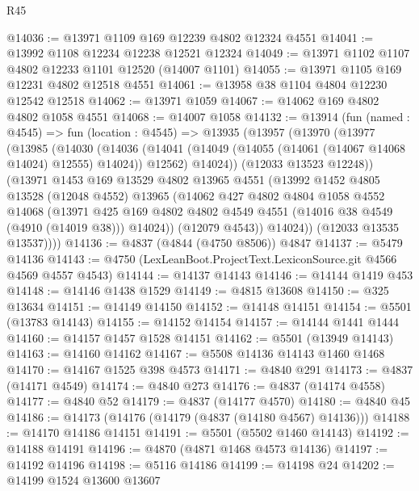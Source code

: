 \begin{lexlean}{R45}
\begin{coremodule}
@14036 := @13971 @1109 @169 @12239 @4802 @12324 @4551
@14041 := @13992 @1108 @12234 @12238 @12521 @12324
@14049 := @13971 @1102 @1107 @4802 @12233 @1101 @12520 (@14007 @1101)
@14055 := @13971 @1105 @169 @12231 @4802 @12518 @4551
@14061 := @13958 @38 @1104 @4804 @12230 @12542 @12518
@14062 := @13971 @1059
@14067 := @14062 @169 @4802 @4802 @1058 @4551
@14068 := @14007 @1058
@14132 := @13914
    (fun (named : @4545) =>
    fun (location : @4545) =>
    @13935
      (@13957
        (@13970
          (@13977
            (@13985
              (@14030
                (@14036
                  (@14041 (@14049 (@14055 (@14061 (@14067 @14068 @14024) @12555) @14024)) @12562)
                  @14024))
              (@12033 @13523 @12248))
            (@13971
              @1453
              @169
              @13529
              @4802
              @13965
              @4551
              (@13992
                @1452
                @4805
                @13528
                (@12048 @4552)
                @13965
                (@14062
                  @427
                  @4802
                  @4804
                  @1058
                  @4552
                  @14068
                  (@13971
                    @425
                    @169
                    @4802
                    @4802
                    @4549
                    @4551
                    (@14016 @38 @4549 (@4910 (@14019 @38)))
                    @14024))
                (@12079 @4543))
              @14024))
          (@12033 @13535 @13537))))
@14136 := @4837 (@4844 (@4750 @8506)) @4847
@14137 := @5479 @14136
@14143 := @4750 (LexLeanBoot.ProjectText.LexiconSource.git @4566 @4569 @4557 @4543)
@14144 := @14137 @14143
@14146 := @14144 @1419 @453
@14148 := @14146 @1438 @1529
@14149 := @4815 @13608
@14150 := @325 @13634
@14151 := @14149 @14150
@14152 := @14148 @14151
@14154 := @5501 (@13783 @14143)
@14155 := @14152 @14154
@14157 := @14144 @1441 @1444
@14160 := @14157 @1457 @1528 @14151
@14162 := @5501 (@13949 @14143)
@14163 := @14160 @14162
@14167 := @5508 @14136 @14143 @1460 @1468
@14170 := @14167 @1525 @398 @4573
@14171 := @4840 @291
@14173 := @4837 (@14171 @4549)
@14174 := @4840 @273
@14176 := @4837 (@14174 @4558)
@14177 := @4840 @52
@14179 := @4837 (@14177 @4570)
@14180 := @4840 @45
@14186 := @14173 (@14176 (@14179 (@4837 (@14180 @4567) @14136)))
@14188 := @14170 @14186 @14151
@14191 := @5501 (@5502 @1460 @14143)
@14192 := @14188 @14191
@14196 := @4870 (@4871 @1468 @4573 @14136)
@14197 := @14192 @14196
@14198 := @5116 @14186
@14199 := @14198 @24
@14202 := @14199 @1524 @13600 @13607

\end{coremodule}
\end{lexlean}
